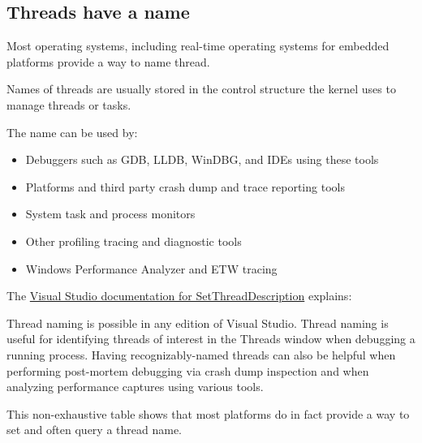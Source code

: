 \documentclass{wg21}
\begin{document}
\subsection{Threads have a name}

Most operating systems, including real-time operating systems for embedded platforms
provide a way to name thread.

Names of threads are usually stored in the control structure the kernel uses to manage threads or tasks.

The name can be used by:
\begin{itemize}
    \item Debuggers such as GDB, LLDB, WinDBG, and IDEs using these tools
    \item Platforms and third party crash dump and trace reporting tools
    \item System task and process monitors
    \item Other profiling tracing and diagnostic tools
    \item Windows Performance Analyzer and ETW tracing
\end{itemize} 

The \href{https://docs.microsoft.com/en-us/visualstudio/debugger/how-to-set-a-thread-name-in-native-code?view=vs-2019}{Visual Studio documentation for SetThreadDescription} explains:

\begin{quoteblock}
Thread naming is possible in any edition of Visual Studio. Thread naming is useful for identifying threads of interest in the Threads window when debugging a running process. Having recognizably-named threads can also be helpful when performing post-mortem debugging via crash dump inspection and when analyzing performance captures using various tools.
\end{quoteblock}

This non-exhaustive table shows that most platforms do in fact provide a way to set and often query a thread name.
\end{document}
